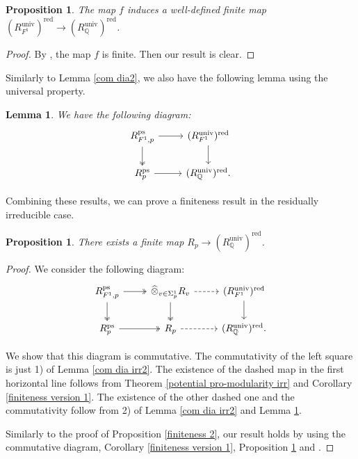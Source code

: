 \documentclass[a4paper, 12pt]{amsart}
\newtheorem{lem}[thm]{Lemma}
\newtheorem{prop}[thm]{Proposition}
\def\ps{\mathrm{ps}}
\newcommand{\Q}{\mathbb{Q}}
\begin{document}
    \begin{prop}\label{finiteness 3}
    	The map $f$ induces a well-defined finite map $(R_{F^1}^{\operatorname{univ}})^{\operatorname{red}} \to (R_\Q^{\operatorname{univ}})^{\operatorname{red}}$.
    \end{prop}
    
    \begin{proof}
    	By \cite[Proposition 3.26]{Gee_2022}, the map $f$ is finite. Then our result is clear.
    \end{proof}
    
    Similarly to Lemma \ref{com dia2}, we also have the following lemma using the universal property.
    
    \begin{lem}\label{com dia irr}
    	We have the following diagram:
    	\[\begin{tikzcd}
    		R_{F^1,p}^\ps  \arrow[r] \arrow[d, two heads]& (R_{F^1}^{\operatorname{univ}})^{\operatorname{red}} \arrow[d]\\
    		 R_{p}^\ps \arrow[r] & (R_\Q^{\operatorname{univ}})^{\operatorname{red}} .
    	\end{tikzcd}\]
    \end{lem}
    
    Combining these results, we can prove a finiteness result in the residually irreducible case.
    
    \begin{prop}\label{finiteness irr}
    	There exists a finite map $ R_{p} \to (R_\Q^{\operatorname{univ}})^{\operatorname{red}}$.
    \end{prop}
    
    \begin{proof}
    	We consider the following diagram:
    	\[\begin{tikzcd}
    		R_{F^1,p}^\ps  \arrow[r, two heads] \arrow[d, two heads]& \widehat{\otimes}_{v \in \Sigma^1_p} R_{v} \arrow[d, two heads]\arrow[r, dashed] & (R_{F^1}^{\operatorname{univ}})^{\operatorname{red}} \arrow[d] \\
    		 R_{p}^\ps \arrow[r, two heads] & R_{p} \arrow[r, dashed] & (R_\Q^{\operatorname{univ}})^{\operatorname{red}}.
    	\end{tikzcd}\]
    	
    	We show that this diagram is commutative. The commutativity of the left square is just 1) of Lemma \ref{com dia irr2}. The existence of the dashed map in the first horizontal line follows from Theorem \ref{potential pro-modularity irr} and Corollary \ref{finiteness version 1}. The existence of the other dashed one and the commutativity follow from 2) of Lemma \ref{com dia irr2} and Lemma \ref{com dia irr}.
    	
    	Similarly to the proof of Proposition \ref{finiteness 2}, our result holds by using the commutative diagram, Corollary \ref{finiteness version 1}, Proposition \ref{finiteness 3} and \cite[Lemma 10.36.15]{stacks-project}.
    \end{proof}
    
\end{document}
